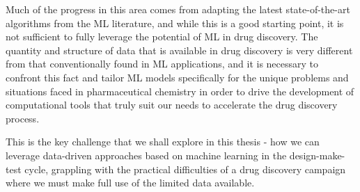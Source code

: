 Much of the progress in this area comes from adapting the latest state-of-the-art algorithms from the ML literature, and while this is a good starting point, it is not sufficient to fully leverage the potential of ML in drug discovery. The quantity and structure of data that is available in drug discovery is very different from that conventionally found in ML applications, and it is necessary to confront this fact and tailor ML models specifically for the unique problems and situations faced in pharmaceutical chemistry in order to drive the development of computational tools that truly suit our needs to accelerate the drug discovery process.

This is the key challenge that we shall explore in this thesis - how we can leverage data-driven approaches based on machine learning in the design-make-test cycle, grappling with the practical difficulties of a drug discovery campaign where we must make full use of the limited data available.




